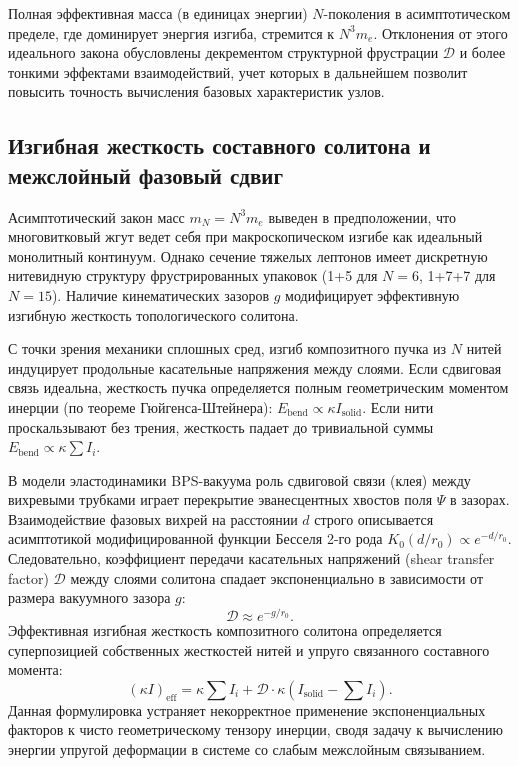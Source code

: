 \documentclass[11pt,a4paper]{article}
\begin{document}
	Полная эффективная масса (в единицах энергии) $N$-поколения в асимптотическом пределе, где доминирует энергия изгиба, стремится к $N^3 m_e$. Отклонения от этого идеального закона обусловлены декрементом структурной фрустрации $\mathcal{D}$ и более тонкими эффектами взаимодействий, учет которых в дальнейшем позволит повысить точность вычисления базовых характеристик узлов.
	
	\subsection{Изгибная жесткость составного солитона и межслойный фазовый сдвиг}
	Асимптотический закон масс $m_N = N^3 m_e$ выведен в предположении, что многовитковый жгут ведет себя при макроскопическом изгибе как идеальный монолитный континуум. Однако сечение тяжелых лептонов имеет дискретную нитевидную структуру фрустрированных упаковок (1+5 для $N=6$, 1+7+7 для $N=15$). Наличие кинематических зазоров $g$ модифицирует эффективную изгибную жесткость топологического солитона.
	
	С точки зрения механики сплошных сред, изгиб композитного пучка из $N$ нитей индуцирует продольные касательные напряжения между слоями. Если сдвиговая связь идеальна, жесткость пучка определяется полным геометрическим моментом инерции (по теореме Гюйгенса-Штейнера): $E_{\text{bend}} \propto \kappa I_{\text{solid}}$. Если нити проскальзывают без трения, жесткость падает до тривиальной суммы $E_{\text{bend}} \propto \kappa \sum I_i$.
	
	В модели эластодинамики BPS-вакуума роль сдвиговой связи (клея) между вихревыми трубками играет перекрытие эванесцентных хвостов поля $\Psi$ в зазорах. Взаимодействие фазовых вихрей на расстоянии $d$ строго описывается асимптотикой модифицированной функции Бесселя 2-го рода $K_0(d/r_0) \propto e^{-d/r_0}$. Следовательно, коэффициент передачи касательных напряжений (shear transfer factor) $\mathcal{D}$ между слоями солитона спадает экспоненциально в зависимости от размера вакуумного зазора $g$:
	\begin{equation}
		\mathcal{D} \approx e^{-g/r_0}.
	\end{equation}
	Эффективная изгибная жесткость композитного солитона определяется суперпозицией собственных жесткостей нитей и упруго связанного составного момента:
	\begin{equation}
		(\kappa I)_{\text{eff}} = \kappa \sum I_i + \mathcal{D} \cdot \kappa \left( I_{\text{solid}} - \sum I_i \right).
	\end{equation}
	Данная формулировка устраняет некорректное применение экспоненциальных факторов к чисто геометрическому тензору инерции, сводя задачу к вычислению энергии упругой деформации в системе со слабым межслойным связыванием.
	
\end{document}
